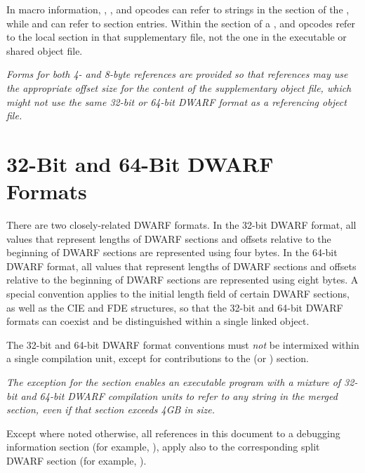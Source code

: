 In macro information, 
\bb
\DWMACROdefinesupfour{},
\DWMACROdefinesupeight{},
\DWMACROundefsupfour{}
 and
\DWMACROundefsupeight{} 
\eb
opcodes can refer to strings in the 
\dotdebugstr{} section of the ,
\bb
while 
\DWMACROimportsupfour{} and \DWMACROimportsupeight{}
\eb
can refer to \dotdebugmacro{} section entries.  Within the 
\dotdebugmacro{} section of a , 
\DWMACROdefinestrp{} and \DWMACROundefstrp{}
opcodes refer to the local \dotdebugstr{} section in that
supplementary file, not the one in
the executable or shared object file.

\bb
\textit{Forms for both 4- and 8-byte references are provided so that references
may use the appropriate offset size for the content of the supplementary
object file, which might not use the same 32-bit or 64-bit DWARF format
as a referencing object file.}
\eb

\section{32-Bit and 64-Bit DWARF Formats}
\label{datarep:32bitand64bitdwarfformats}
\hypertarget{datarep:xxbitdwffmt}{}
There are two closely-related DWARF
formats. In the 32-bit DWARF
format, all values that represent lengths of DWARF sections
and offsets relative to the beginning of DWARF sections are
represented using four bytes. In the 64-bit DWARF format, all
values that represent lengths of DWARF sections and offsets
relative to the beginning of DWARF sections are represented
using eight bytes. A special convention applies to the initial
length field of certain DWARF sections, as well as the CIE and
FDE structures, so that the 32-bit and 64-bit DWARF formats
can coexist and be distinguished within a single linked object.

\bb
The 32-bit and 64-bit DWARF format conventions must \emph{not} be
intermixed within a single compilation 
\bb
unit, except for contributions to the \dotdebugstroffsets{} 
(or \dotdebugstroffsetsdwo) section.
\eb

\textit{The exception for the \dotdebugstroffsets{} section enables 
an executable program with a mixture of 32-bit and 64-bit DWARF compilation 
units to refer to any string in the merged \dotdebugstr{} section, 
even if that section exceeds 4GB in size.}
\eb

Except where noted otherwise, all references in this document
to a debugging information section (for example, \dotdebuginfo),
apply also to the corresponding split DWARF section (for example,
\dotdebuginfodwo).

